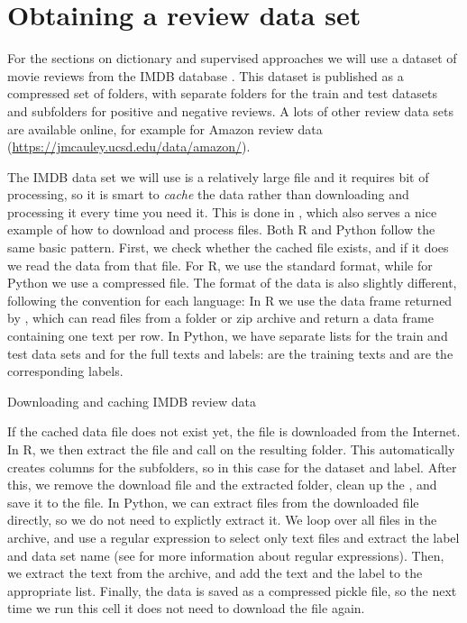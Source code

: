 \section{Obtaining a review data set}
\label{sec:reviewdataset}

For the sections on dictionary and supervised approaches we will use a dataset of movie reviews
from the IMDB database \citep{aclimdb}.
This dataset is published as a compressed set of folders, with separate folders for the train and test datasets and subfolders for positive and negative reviews.
A lots of other review data sets are available online, for example for Amazon review data (\url{https://jmcauley.ucsd.edu/data/amazon/}). 

The IMDB data set we will use is a relatively large file and it requires bit of processing,
so it is smart to \emph{cache} the data rather than downloading and processing it every time you need it.
This is done in , which also serves a nice example of how to download and process files.
Both R and Python follow the same basic pattern.
First, we check whether the cached file exists, and if it does we read the data from that file.
For R, we use the standard  format, while for Python we use a compressed  file.
The format of the data is also slightly different, following the convention for each language:
In R we use the data frame returned by ,
which can read files from a folder or zip archive and return a data frame containing one text per row.
In Python, we have separate lists for the train and test data sets and for the full texts and labels:
 are the training texts and  are the corresponding labels.

\begin{ccsexample}
  \caption{Downloading and caching IMDB review data}\label{ex:reviewdata}
\end{ccsexample}

If the cached data file does not exist yet,
the file is downloaded from the Internet.
In R, we then extract the file and call  on the resulting folder.
This automatically creates columns for the subfolders, so in this case for the dataset and label.
After this, we remove the download file and the extracted folder,
clean up the , and save it to the  file.
In Python, we can extract files from the downloaded file directly,
so we do not need to explictly extract it.
We loop over all files in the archive, and use a regular expression to
select only text files and extract the label and data set name
(see  for more information about regular expressions).
Then, we extract the text from the archive, and add the text and the label to the appropriate list.
Finally, the data is saved as a compressed pickle file,
so the next time we run this cell it does not need to download the file again. 

